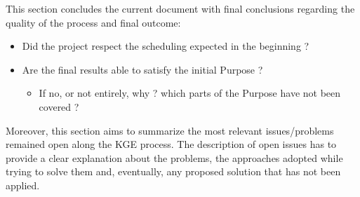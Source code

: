 This section concludes the current document with final conclusions regarding the quality of the process and final outcome:
\begin{itemize}
    \item Did the project respect the scheduling expected in the beginning ?
    \item Are the final results able to satisfy the initial Purpose ?
        \begin{itemize}
            \item If no, or not entirely, why ? which parts of the Purpose have not been covered ?
        \end{itemize}
\end{itemize}


\noindent Moreover, this section aims to summarize the most relevant issues/problems remained open along the KGE process. The description of open issues has to provide a clear explanation about the problems, the approaches adopted while trying to solve them and, eventually, any proposed solution that has not been applied.